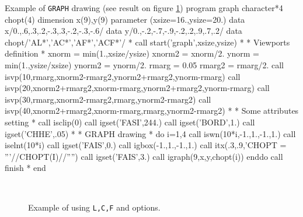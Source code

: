 \newpage
\begin{XMPt}{Example of {\tt GRAPH} drawing (see result on figure \ref{GRAPH})}
      program  graph 
      character*4 chopt(4)
      dimension x(9),y(9)
      parameter (xsize=16.,ysize=20.)
      data x/0.,.6,.3,.2,-.3,.3,-.2,-.3,-.6/
      data y/0.,-.2,-.7,-.9,-.2,.2,.9,.7,.2/
      data chopt/'AL*','AC*','AF*','ACF*'/
*
      call start('graph',xsize,ysize)
*
*              Viewports definition
*
      xnorm  = min(1.,xsize/ysize)
      xnorm2 = xnorm/2.
      ynorm  = min(1.,ysize/xsize)
      ynorm2 = ynorm/2.
      rmarg  = 0.05
      rmarg2 = rmarg/2.
      call isvp(10,rmarg,xnorm2-rmarg2,ynorm2+rmarg2,ynorm-rmarg)
      call isvp(20,xnorm2+rmarg2,xnorm-rmarg,ynorm2+rmarg2,ynorm-rmarg)
      call isvp(30,rmarg,xnorm2-rmarg2,rmarg,ynorm2-rmarg2)
      call isvp(40,xnorm2+rmarg2,xnorm-rmarg,rmarg,ynorm2-rmarg2)
*
*              Some attributes setting
*
      call isclip(0)
      call igset('FASI',244.)
      call igset('BORD',1.)
      call igset('CHHE',.05)
*
*              GRAPH drawing
*
      do i=1,4
         call iswn(10*i,-1.,1.,-1.,1.)
         call iselnt(10*i)
         call igset('FAIS',0.)
         call igbox(-1.,1.,-1.,1.)
         call itx(.3,.9,'CHOPT = '''//CHOPT(I)//'''')
         call igset('FAIS',3.)
         call igraph(9,x,y,chopt(i))
      enddo
      call finish
*
      end
\end{XMPt}

\begin{figure}[p]
\begin{center}
\mbox{}\\[-1cm]
\mbox{}
\end{center}
\caption{Example of \protect{} using {\tt L,C,F} and {\tt*} options.}
\label{GRAPH}
\end{figure}
\clearpage 

